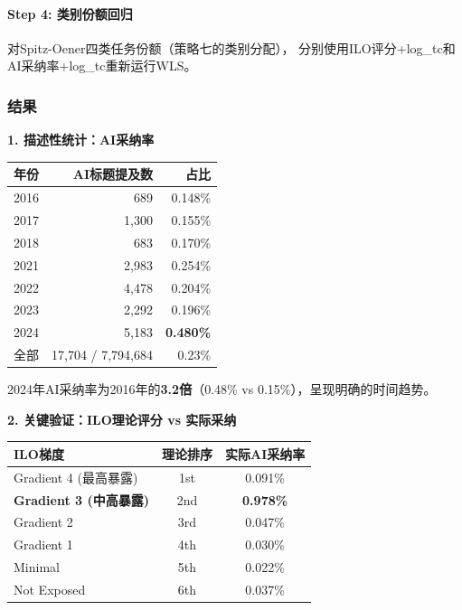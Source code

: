 \documentclass[12pt,a4paper]{ctexart}
\begin{document}
\paragraph{Step 4: 类别份额回归}

对Spitz-Oener四类任务份额（策略七的类别分配），
分别使用ILO评分+log\_tc和AI采纳率+log\_tc重新运行WLS。

\subsubsection{结果}

\begin{resultbox}[策略八结果]

\textbf{1. 描述性统计：AI采纳率}

\begin{center}
\small
\begin{tabular}{lrr}
\toprule
年份 & AI标题提及数 & 占比 \\
\midrule
2016 & 689 & 0.148\% \\
2017 & 1,300 & 0.155\% \\
2018 & 683 & 0.170\% \\
2021 & 2,983 & 0.254\% \\
2022 & 4,478 & 0.204\% \\
2023 & 2,292 & 0.196\% \\
2024 & 5,183 & \textbf{0.480\%} \\
\midrule
全部 & 17,704 / 7,794,684 & 0.23\% \\
\bottomrule
\end{tabular}
\end{center}

2024年AI采纳率为2016年的\textbf{3.2倍}（0.48\% vs 0.15\%），呈现明确的时间趋势。

\medskip
\textbf{2. 关键验证：ILO理论评分 vs 实际采纳}

\begin{center}
\begin{tabular}{lcc}
\toprule
ILO梯度 & 理论排序 & 实际AI采纳率 \\
\midrule
Gradient 4 (最高暴露) & 1st & 0.091\% \\
\textbf{Gradient 3 (中高暴露)} & 2nd & \textbf{0.978\%} \\
Gradient 2 & 3rd & 0.047\% \\
Gradient 1 & 4th & 0.030\% \\
Minimal & 5th & 0.022\% \\
Not Exposed & 6th & 0.037\% \\
\bottomrule
\end{tabular}
\end{center}


\end{resultbox}
\end{document}
